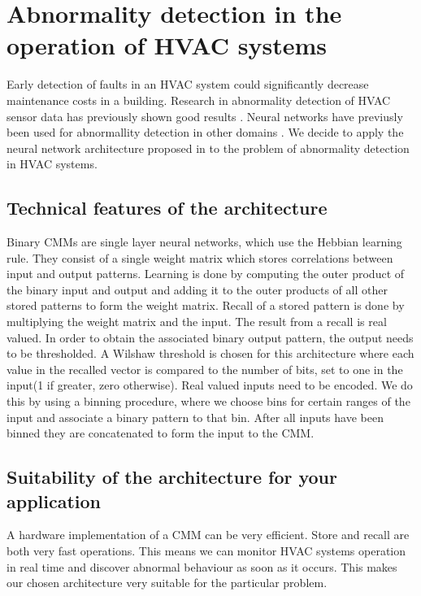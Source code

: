 \documentclass[a4paper, 11pt]{article}
\begin{document}
\section{Abnormality detection in the operation of HVAC systems}
Early detection of faults in an HVAC system could significantly decrease maintenance costs in a building. Research in abnormality detection of HVAC sensor data has previously shown good results \cite{Narayanaswamy2014}. Neural networks have previusly been used for abnormallity detection in other domains \cite{wrro89505}. We decide to apply the neural network architecture proposed in \cite{wrro89505} to the problem of abnormality detection in HVAC systems.
\subsection{Technical features of the architecture}

Binary CMMs are single layer neural networks, which use the Hebbian learning rule. They consist of a single weight matrix which stores correlations between input and output patterns. Learning is done by computing the outer product of the binary input and output and adding it to the outer products of all other stored patterns to form the weight matrix. Recall of a stored pattern is done by multiplying the weight matrix and the input. The result from a recall is real valued. In order to obtain the associated binary output pattern, the output needs to be thresholded. A Wilshaw threshold is chosen for this architecture where each value in the recalled vector is compared to the number of bits, set to one in the input(1 if greater, zero otherwise). Real valued inputs need to be encoded. We do this by using a binning procedure, where we choose bins for certain ranges of the input and associate a binary pattern to that bin. After all inputs have been binned they are concatenated to form the input to the CMM. 
\subsection{Suitability of the architecture for your application}
A hardware implementation of a CMM can be very efficient. Store and recall are both very fast operations. This means we can monitor HVAC systems operation in real time and discover abnormal behaviour as soon as it occurs. This makes our chosen architecture very suitable for the particular problem.
\end{document}
